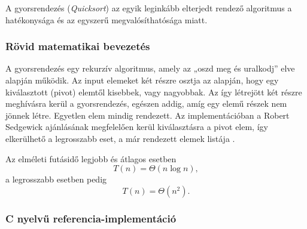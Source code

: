 
A gyorsrendezés (\textit{Quicksort}) az egyik leginkább elterjedt rendező algoritmus a hatékonysága és az egyszerű megvalósíthatósága miatt.

\subsubsection{Rövid matematikai bevezetés}

A gyorsrendezés egy rekurzív algoritmus, amely az „oszd meg és uralkodj” elve alapján működik. Az input elemeket két részre osztja az alapján, hogy egy kiválasztott (pivot) elemtől kisebbek, vagy nagyobbak. Az így létrejött két részre meghívásra kerül a gyorsrendezés, egészen addig, amíg egy elemű részek nem jönnek létre. Egyetlen elem mindig rendezett. Az implementációban a Robert Sedgewick ajánlásának megfelelően kerül kiválasztásra a pivot elem, így elkerülhető a legrosszabb eset, a már rendezett elemek listája \cite{sedgewickquicksort}.

Az elméleti futásidő legjobb és átlagos esetben
\[ T(n) = \Theta(n \log n), \]
a legrosszabb esetben pedig
\[ T(n) = \Theta(n^2).\]
 
\subsubsection{C nyelvű referencia-implementáció}

